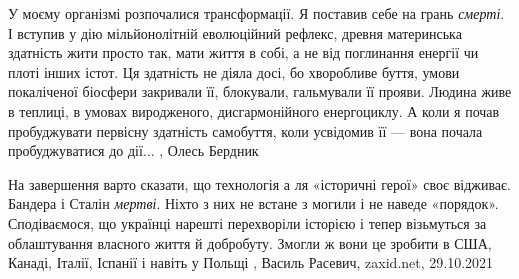 У моєму організмі розпочалися трансформації. Я поставив себе на грань \emph{смерті}. І
вступив у дію мільйонолітній еволюційний рефлекс, древня материнська здатність
жити просто так, мати життя в собі, а не від поглинання енергії чи плоті інших
істот. Ця здатність не діяла досі, бо хворобливе буття, умови покаліченої
біосфери закривали її, блокували, гальмували її прояви. Людина живе в теплиці,
в умовах виродженого, дисгармонійного енергоциклу. А коли я почав пробуджувати
первісну здатність самобуття, коли усвідомив її — вона почала пробуджуватися до
дії...
, Олесь Бердник

На завершення варто сказати, що технологія а ля «історичні герої» своє
відживає. Бандера і Сталін \emph{мертві}. Ніхто з них не встане з могили і не наведе
«порядок». Сподіваємося, що українці нарешті перехворіли історією і тепер
візьмуться за облаштування власного життя й добробуту. Змогли ж вони це зробити
в США, Канаді, Італії, Іспанії і навіть у Польщі
, 
Василь Расевич, zaxid.net, 29.10.2021

